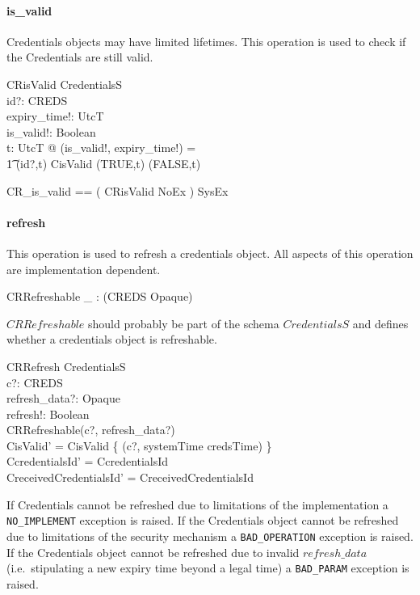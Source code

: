 \paragraph{is\_valid}
Credentials objects may have limited lifetimes.  This operation is used to check
if the Credentials are still valid.
\begin{schema}{CRisValid}
  \Xi CredentialsS \\
  id?: CREDS \\
  expiry\_time!: UtcT \\
  is\_valid!: Boolean \\
  \where
  \forall t: UtcT @ (is\_valid!, expiry\_time!) = \\
  \t1 \IF (id?,t) \in CisValid \THEN (TRUE,t) \ELSE (FALSE,t) \\
\end{schema}
\begin{zed}
  CR\_is\_valid == ( CRisValid \land NoEx ) \lor SysEx \\
\end{zed}


\paragraph{refresh}
This operation is used to refresh a credentials object.  All aspects of this
operation are implementation dependent.

\begin{axdef}
  CRRefreshable \_ : \power (CREDS \cross Opaque) \\
\end{axdef}
$CRRefreshable$ should probably be part of the schema $CredentialsS$ and defines
whether a credentials object is refreshable.
\begin{schema}{CRRefresh}
  \Delta CredentialsS \\
  c?: CREDS \\
  refresh\_data?: Opaque \\
  refresh!: Boolean \\
  \where
  CRRefreshable(c?, refresh\_data?) \\
  CisValid' = CisValid \oplus \{ (c?, systemTime \utctp credsTime) \} \\
  CcredentialsId' = CcredentialsId \\
  CreceivedCredentialsId' = CreceivedCredentialsId \\
\end{schema}
If Credentials cannot be refreshed due to limitations of the implementation a
\texttt{NO\_IMPLEMENT} exception is raised.  If the Credentials object cannot be
refreshed due to limitations of the security mechanism a \texttt{BAD\_OPERATION}
exception is raised.  If the Credentials object cannot be refreshed due to
invalid $refresh\_data$ (i.e.\ stipulating a new expiry time beyond a legal
time) a \texttt{BAD\_PARAM} exception is raised.

